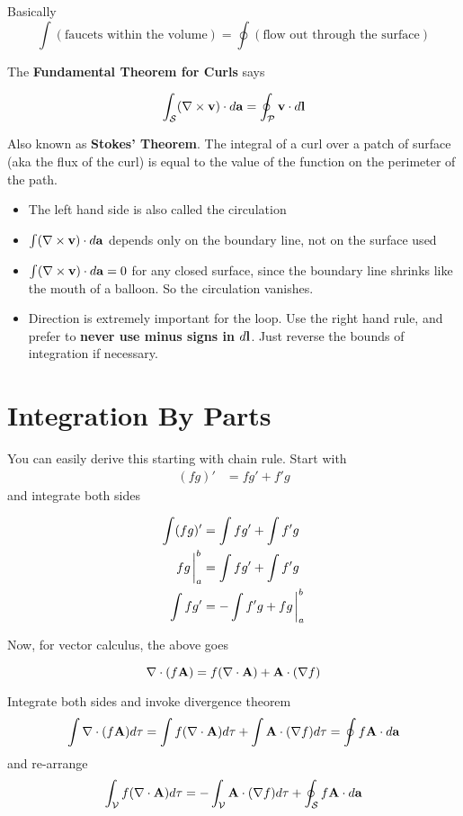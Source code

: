 \documentclass{article}
\begin{document}
Basically
$$
\int (\text{faucets within the volume}) = \oint (\text{flow out through the surface})
$$

The \textbf{Fundamental Theorem for Curls} says

$$
\int_{\mathcal{S}}(\nabla \times \vb{v}) \cdot d\vb{a} = \oint_{\mathcal{P}} \vb{v} \cdot d\vb{l}
$$

Also known as \textbf{Stokes' Theorem}.  The integral of a curl over a patch of surface (aka the flux of the curl) is equal to the value of the function on the perimeter of the path.

\begin{itemize}
    \item The left hand side is also called the circulation
    \item $\int(\nabla \times \vb{v}) \cdot d\vb{a}$ depends only on the boundary line, not on the surface used
    \item $\int(\nabla \times \vb{v}) \cdot d\vb{a} = 0$  for any closed surface, since the boundary line shrinks like the mouth of a balloon.  So the circulation vanishes.
    \item Direction is extremely important for the loop.  Use the right hand rule, and prefer to \textbf{never use minus signs in $d\vb{l}$}.  Just reverse the bounds of integration if necessary.
\end{itemize}

\section{Integration By Parts}

You can easily derive this starting with chain rule.  Start with
\begin{align*}
(fg)' & = fg' + f'g    
\end{align*}
and integrate both sides

\begin{align*}
\int (fg)' & = \int fg' + \int f'g   \\
fg \eval_a^b & = \int fg' + \int f'g \\
\int fg'& = -\int f'g + fg \eval_a^b
\end{align*}

Now, for vector calculus, the above goes

$$
\nabla \cdot (f\vb{A}) = f(\nabla \cdot \vb{A}) + \vb{A} \cdot (\nabla f)
$$

Integrate both sides and invoke divergence theorem
$$
\int \nabla \cdot (f\vb{A}) d\tau = \int f(\nabla \cdot \vb{A}) d\tau +  \int \vb{A} \cdot (\nabla f) d\tau = \oint f\vb{A} \cdot d\vb{a}
$$
and re-arrange
$$
\int_{\mathcal{V}} f(\nabla \cdot \vb{A}) d\tau = - \int_{\mathcal{V}} \vb{A} \cdot (\nabla f) d\tau + \oint_{\mathcal{S}} f\vb{A} \cdot d\vb{a}
$$
\end{document}
